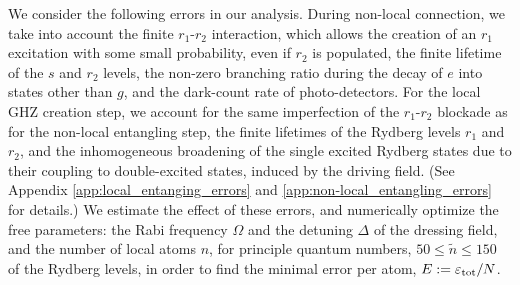 We consider the following errors in our analysis. During
non-local connection, we take into account the finite $r_1$-$r_2$ interaction, which
allows the creation of an $r_1$ excitation with some small probability, even if
$r_2$ is populated, the finite lifetime of the $s$ and $r_2$ levels, the
non-zero branching ratio during the decay of $e$ into states other than $g$, and
the dark-count rate of photo-detectors. For the local GHZ creation step, we account
for the same imperfection of the
$r_1$-$r_2$ blockade as for the non-local entangling step, the finite lifetimes
of the Rydberg levels $r_1$ and $r_2$, and the inhomogeneous broadening of the
single excited Rydberg states due to their coupling to double-excited states,
induced by the driving field.
(See Appendix \ref{app:local_entanging_errors} and
\ref{app:non-local_entangling_errors} for details.) We estimate the effect of these errors, and numerically optimize the free parameters: the Rabi frequency
$\Omega$ and the detuning $\Delta$ of the dressing field, and the
number of local atoms $n$, for principle quantum numbers, $50\leq \tilde n \leq
150$ of the Rydberg levels, in order to find the minimal
error per atom, $E := \varepsilon_\mathrm{tot}/N$.
 
